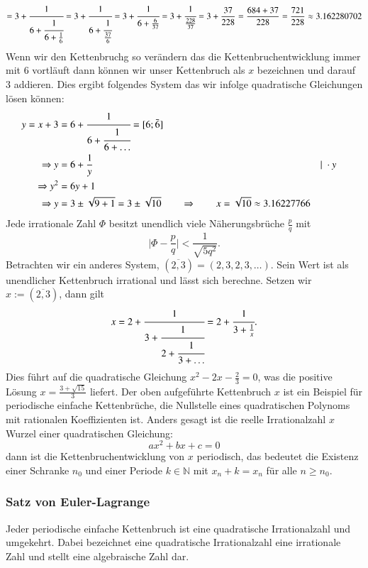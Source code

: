 \begin{equation}
[3;6;6;6]
=
3 + \cfrac{1}{6+\cfrac{1}{6+\frac{1}{6}}}
=
3 + \cfrac{1}{6+\cfrac{1}{\frac{37}{6}}}
=
3 + \cfrac{1}{6+\frac{6}{37}}
=
3 + \cfrac{1}{\frac{228}{37}}
=
3 + \frac{37}{228}
=
\frac{684+37}{228}
=
\frac{721}{228}
\approx
3.162280702
\end{equation}
Wenn wir den Kettenbruchg so verändern das die Kettenbruchentwicklung 
immer mit 6 vortläuft dann können wir unser Kettenbruch als $x$ bezeichnen 
und darauf 3 addieren. Dies ergibt folgendes System das wir infolge quadratische
Gleichungen lösen können:
\begin{align*}
y = x+3 &= 6 + \cfrac{1}{6+\cfrac{1}{6+\dots}} = [6;\bar{6}]
\\
\Rightarrow y &= 6 + \frac{1}{y}	&&\vert\;\cdot y
\\
\Rightarrow y^2 &= 6y + 1
\\
\Rightarrow y &= 3\pm \sqrt{9+1} = 3 \pm \sqrt{10}\qquad\Rightarrow\qquad x = \sqrt{10}
\approx
3.16227766
\end{align*}
Jede irrationale Zahl $\Phi$ besitzt unendlich viele Näherungsbrüche
$\frac{p}{q}$ mit
\begin{equation}
\biggl|\Phi-\frac{p}{q}\biggr|<\frac{1}{\sqrt{5 q^2}}.
\end{equation}
Betrachten wir ein anderes System, $(\overline{2,3}) =  (2,3,2,3,\dots)$.
Sein Wert ist als unendlicher Kettenbruch irrational und lässt sich
berechne. Setzen wir $x:=(\overline{2,3})$, dann gilt
\begin{equation}
x
=
2 + \cfrac{1}{3+\cfrac{1}{2+\cfrac{1}{3+\dots}}}
=
2 + \cfrac{1}{3+\frac{1}{x}}.
\end{equation}
Dies führt auf die quadratische Gleichung $x^2 - 2x - \frac{2}{3}
= 0$, was die positive Lösung $x = \frac{3+\sqrt{15}}{3}$ liefert.
Der oben aufgeführte Kettenbruch $x$ ist ein Beispiel für periodische
einfache Kettenbrüche, die Nullstelle eines quadratischen Polynoms
mit rationalen Koeffizienten ist. Anders gesagt ist die reelle
Irrationalzahl $x$ Wurzel einer quadratischen Gleichung:
\begin{equation}
ax^2 + bx + c = 0
\end{equation}
dann ist die Kettenbruchentwicklung von $x$ periodisch, das bedeutet
die Existenz einer Schranke $n_0$ und einer Periode $k \in \mathbb{N}$
mit $x_n+k = x_n$ für alle $n\ge n_0$.

\subsubsection{Satz von Euler-Lagrange}
Jeder periodische einfache Kettenbruch ist eine quadratische
Irrationalzahl und umgekehrt. Dabei bezeichnet eine quadratische
Irrationalzahl eine irrationale Zahl und stellt eine algebraische
Zahl dar.

